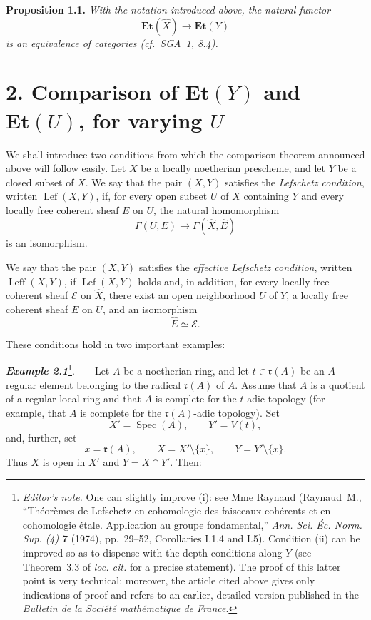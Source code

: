 \documentclass[11pt,a4paper,oneside]{book}
\providecommand{\Et}{\mathbf{Et}}
\providecommand{\Lefc}{\operatorname{Lef}}
\providecommand{\Leffc}{\operatorname{Leff}}
\theoremstyle{plain}
\theoremstyle{definition}
\theoremstyle{remark}
\begin{document}
\medskip
{}\noindent\textbf{Proposition 1.1.}\quad
\emph{With the notation introduced above, the natural functor
\[
  \Et(\widehat X)\longrightarrow\Et(Y)
\]
is an equivalence of categories (cf.\ SGA~1, 8.4).}

\section*{2. Comparison of $\Et(Y)$ and $\Et(U)$, for varying $U$}

We shall introduce two conditions from which the comparison theorem announced
above will follow easily. Let $X$ be a locally noetherian prescheme, and let
$Y$ be a closed subset of $X$. We say that the pair $(X,Y)$ satisfies the
\emph{Lefschetz condition}, written $\Lefc(X,Y)$, if, for every open subset
$U$ of $X$ containing $Y$ and every locally free coherent sheaf $E$ on $U$,
the natural homomorphism
\[
  \Gamma(U,E)\longrightarrow\Gamma(\widehat X,\widehat E)
\]
is an isomorphism.

We say that the pair $(X,Y)$ satisfies the \emph{effective Lefschetz
condition}, written $\Leffc(X,Y)$, if $\Lefc(X,Y)$ holds and, in addition,
for every locally free coherent sheaf $\mathcal E$ on $\widehat X$, there
exist an open neighborhood $U$ of $Y$, a locally free coherent sheaf $E$ on
$U$, and an isomorphism
\[
  \widehat E\simeq\mathcal E.
\]

These conditions hold in two important examples:

\medskip
{}\noindent\textbf{\textit{Example 2.1}}\footnote{\textit{Editor's note.}
One can slightly improve (i): see Mme Raynaud (Raynaud~M., ``Théorèmes de
Lefschetz en cohomologie des faisceaux cohérents et en cohomologie étale.
Application au groupe fondamental,'' \emph{Ann. Sci. Éc. Norm. Sup. (4)}
\textbf{7} (1974), pp.~29--52, Corollaries I.1.4 and I.5). Condition (ii) can
be improved so as to dispense with the depth conditions along $Y$ (see
Theorem~3.3 of \emph{loc. cit.} for a precise statement). The proof of this
latter point is very technical; moreover, the article cited above gives only
indications of proof and refers to an earlier, detailed version published in
the \emph{Bulletin de la Société mathématique de France}.}.\ ---\ 
Let $A$ be a noetherian ring, and let $t\in\mathfrak r(A)$ be an
$A$-regular element belonging to the radical $\mathfrak r(A)$ of $A$.
Assume that $A$ is a quotient of a regular local ring and that $A$ is
complete for the $t$-adic topology (for example, that $A$ is complete for
the $\mathfrak r(A)$-adic topology). Set
\[
  X'=\operatorname{Spec}(A),\qquad Y'=V(t),
\]
and, further, set
\[
  x=\mathfrak r(A),\qquad X=X'\setminus\{x\},\qquad
  Y=Y'\setminus\{x\}.
\]
Thus $X$ is open in $X'$ and $Y=X\cap Y'$. Then:
\end{document}
